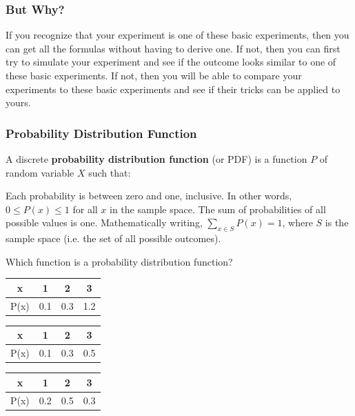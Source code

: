 \begin{frame}
\frametitle{But Why?}
\begin{tasks}[label = $\circ$]
\task If you recognize that your experiment is one of these basic experiments, then you can get all the formulas without having to derive one.
\task If not, then you can first try to simulate your experiment and see if the outcome looks similar to one of these basic experiments.
\task If not, then you will be able to compare your experiments to these basic experiments and see if their tricks can be applied to yours.
\end{tasks}
\end{frame}

\begin{frame}
\frametitle{Probability Distribution Function}
\begin{defn}{}{}
A discrete \textbf{probability distribution function} (or PDF) is a function $P$ of random variable $X$ such that:
\begin{tasks}[label = $\circ$]
\task Each probability is between zero and one, inclusive. In other words, $0 \leq P(x) \leq 1$ for all $x$ in the sample space.
\task The sum of probabilities of all possible values is one. Mathematically writing, $\sum\limits_{x \in S} P(x) = 1$, where $S$ is the sample space (i.e. the set of all possible outcomes).
\end{tasks}
\end{defn}
\end{frame}

\begin{frame}
\begin{ex}
Which function is a probability distribution function?
\end{ex}
\begin{table}
\begin{tabular}{C|C|C|C}
x & 1 & 2 & 3 \\
\hline
P(x) & 0.1 & 0.3 & 1.2
\end{tabular} 
\end{table}

\begin{table}
\begin{tabular}{C|C|C|C}
x & 1 & 2 & 3 \\
\hline
P(x) & 0.1 & 0.3 & 0.5
\end{tabular} 
\end{table}

\begin{table}
\begin{tabular}{C|C|C|C}
x & 1 & 2 & 3 \\
\hline
P(x) & 0.2 & 0.5 & 0.3
\end{tabular} 
\end{table}
\end{frame}

